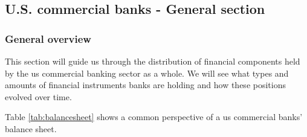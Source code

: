 \documentclass[12pt, a4paper]{article} %
\begin{document}

\subsection{U.S. commercial banks - General section}
\label{sec:AssetLiabs}

\subsubsection{General overview}
This section will guide us through the distribution of financial components held by the us commercial banking sector as a whole. We will see what types and amounts of financial instruments banks are holding and how these positions evolved over time. 


Table \ref{tab:balancesheet} shows a common perspective of a us commercial banks' balance sheet.
\end{document}
